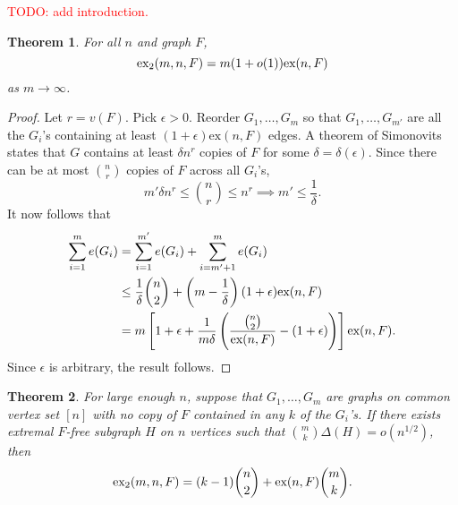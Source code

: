 \documentclass[10pt, reqno]{report}
\newtheorem{theorem}{Theorem}[chapter]
\newcommand*{\ex}{\textnormal{ex}}
\newcommand*{\dex}{\textnormal{ex}_2}
\begin{document}
\textcolor{red}{TODO: add introduction.}

\begin{theorem}
  For all $n$ and graph $F$,
  \[
    \dex(m, n, F) = m(1 + o(1))\ex(n, F)
  \]
  as $m \to \infty$.
\end{theorem}

\begin{proof}
  Let $r = v(F)$. Pick $\epsilon > 0$. Reorder $G_1, \ldots, G_m$ so that $G_1, \ldots, G_{m'}$ are all the $G_i$'s containing at least $(1 + \epsilon)\text{ex}(n, F)$ edges. A theorem of Simonovits states that $G$ contains at least $\delta n^r$ copies of $F$ for some $\delta = \delta(\epsilon)$. Since there can be at most $\binom{n}{r}$ copies of $F$ across all $G_i$'s, 
  \[
    m'\delta n^{r} \leq \binom{n}{r} \leq n^r \implies m' \leq \frac{1}{\delta}.
  \]
  It now follows that
  \begin{align*}
    \sum_{i = 1}^m e(G_i) 
    &= \sum_{i = 1}^{m'} e(G_i) + \sum_{i = m' + 1}^m e(G_i) \\
    &\leq \frac{1}{\delta}\binom{n}{2} + \left(m - \frac{1}{\delta}\right)(1 + \epsilon)\text{ex}(n, F) \\
    &= m\left[1 + \epsilon + \frac{1}{m\delta}\left(\frac{\binom{n}{2}}{\ex(n, F)} - (1 + \epsilon)\right)\right]\ex(n, F).
  \end{align*}
  Since $\epsilon$ is arbitrary, the result follows.
\end{proof}

\begin{theorem}
  For large enough $n$, suppose that $G_1, \ldots, G_m$ are graphs on common vertex set $[n]$ with no copy of $F$ contained in any $k$ of the $G_i$'s. If there exists extremal $F$-free subgraph $H$ on $n$ vertices such that $\binom{m}{k}\Delta(H) = o(n^{1/2})$, then
  \[
    \dex(m, n ,F) = (k - 1)\binom{n}{2} + \ex(n, F)\binom{m}{k}.
  \]
\end{theorem}
\end{document}
